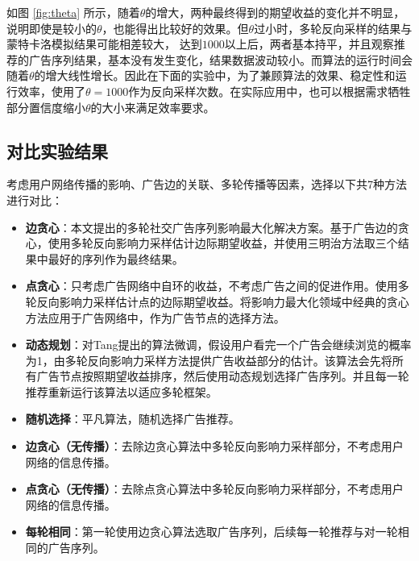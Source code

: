 如图 \ref{fig:theta} 所示，随着$\theta$的增大，两种最终得到的期望收益的变化并不明显，说明即使是较小的$\theta$，也能得出比较好的效果。但$\theta$过小时，多轮反向采样的结果与蒙特卡洛模拟结果可能相差较大， 达到$1000$以上后，两者基本持平，并且观察推荐的广告序列结果，基本没有发生变化，结果数据波动较小。而算法的运行时间会随着$\theta$的增大线性增长。因此在下面的实验中，为了兼顾算法的效果、稳定性和运行效率，使用了$\theta=1000$作为反向采样次数。在实际应用中，也可以根据需求牺牲部分置信度缩小$\theta$的大小来满足效率要求。

\subsection{对比实验结果}

考虑用户网络传播的影响、广告边的关联、多轮传播等因素，选择以下共7种方法进行对比：

\begin{itemize}
    \item {\bfseries 边贪心}：本文提出的多轮社交广告序列影响最大化解决方案。基于广告边的贪心，使用多轮反向影响力采样估计边际期望收益，并使用三明治方法取三个结果中最好的序列作为最终结果。
    \item {\bfseries 点贪心}：只考虑广告网络中自环的收益，不考虑广告之间的促进作用。使用多轮反向影响力采样估计点的边际期望收益。将影响力最大化领域中经典的贪心方法\cite{kempe2003maximizing}应用于广告网络中，作为广告节点的选择方法。
    \item {\bfseries 动态规划}：对Tang\cite{tang2018social}提出的算法微调，假设用户看完一个广告会继续浏览的概率为1，由多轮反向影响力采样方法提供广告收益部分的估计。该算法会先将所有广告节点按照期望收益排序，然后使用动态规划选择广告序列。并且每一轮推荐重新运行该算法以适应多轮框架。
    \item {\bfseries 随机选择}：平凡算法，随机选择广告推荐。
    \item {\bfseries 边贪心（无传播）}：去除边贪心算法中多轮反向影响力采样部分，不考虑用户网络的信息传播。
    \item {\bfseries 点贪心（无传播）}：去除点贪心算法中多轮反向影响力采样部分，不考虑用户网络的信息传播。
    \item {\bfseries 每轮相同}：第一轮使用边贪心算法选取广告序列，后续每一轮推荐与对一轮相同的广告序列。 
\end{itemize}

